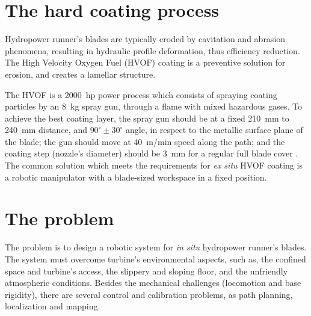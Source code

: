 \section{The hard coating process}\label{hvof}

Hydropower runner's blades are typically eroded by cavitation and abrasion
phenomena, resulting in hydraulic profile deformation, thus efficiency
reduction. The High Velocity Oxygen Fuel (HVOF) coating is a preventive
solution for erosion, and creates a lamellar structure. 

The HVOF is a 2000~hp power process which consists of
spraying coating particles by an 8~kg spray gun, through a flame with mixed
hazardous gases. To achieve the best coating layer, the spray gun should be at
a fixed 210~mm to 240~mm distance, and $90^\circ \pm 30^\circ$ angle, in respect
to the metallic surface plane of the blade; the gun should move at 40~m/min
speed along the path; and the coating step (nozzle's diameter) should be 3~mm
for a regular full blade cover \cite{li2002effect}. The
common solution which meets the requirements for \textit{ex situ} HVOF coating
is a robotic manipulator with a blade-sized workspace in a fixed position.

\section{The problem}\label{problem}

The problem is to design a robotic system for \textit{in situ}
hydropower runner's blades. The system must overcome turbine's environmental
aspects, such as, the confined space and turbine's access, the slippery and
sloping floor, and the unfriendly atmospheric conditions. Besides the mechanical
challenges (locomotion and base rigidity), there are several control and
calibration problems, as path planning, localization and mapping.


